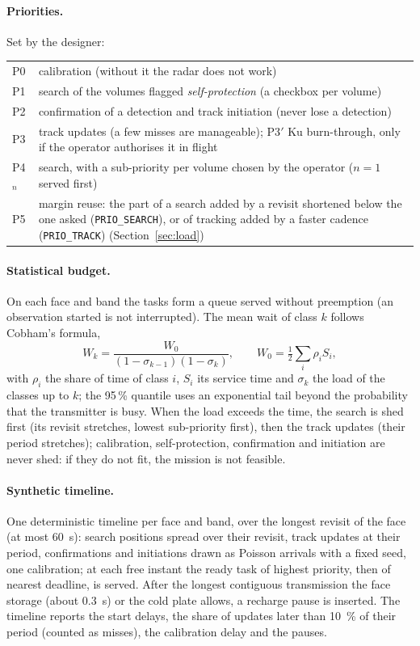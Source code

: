 \documentclass[11pt,a4paper]{article}
\newcommand{\code}[1]{\texttt{\small #1}}
\begin{document}
\paragraph{Priorities.} Set by the designer:
\begin{center}
\begin{tabularx}{\linewidth}{@{}lL@{}}
\toprule
P0 & calibration (without it the radar does not work)\\
P1 & search of the volumes flagged \emph{self-protection} (a checkbox per volume)\\
P2 & confirmation of a detection and track initiation (never lose a detection)\\
P3 & track updates (a few misses are manageable); P3$'$ Ku burn-through, only if the operator authorises it in flight\\
P4$_n$ & search, with a sub-priority per volume chosen by the operator ($n = 1$ served first)\\
P5 & margin reuse: the part of a search added by a revisit shortened below the one asked (\code{PRIO\_SEARCH}), or of
tracking added by a faster cadence (\code{PRIO\_TRACK}) (Section~\ref{sec:load})\\
\bottomrule
\end{tabularx}
\end{center}

\paragraph{Statistical budget.} On each face and band the tasks form a queue served without preemption (an observation
started is not interrupted). The mean wait of class $k$ follows Cobham's formula,
\[
  W_k = \frac{W_0}{(1-\sigma_{k-1})(1-\sigma_k)},\qquad W_0 = \tfrac12\textstyle\sum_i \rho_i S_i,
\]
with $\rho_i$ the share of time of class $i$, $S_i$ its service time and $\sigma_k$ the load of the classes up to $k$;
the 95\,\% quantile uses an exponential tail beyond the probability that the transmitter is busy. When the load exceeds
the time, the search is shed first (its revisit stretches, lowest sub-priority first), then the track updates (their
period stretches); calibration, self-protection, confirmation and initiation are never shed: if they do not fit, the
mission is not feasible.

\paragraph{Synthetic timeline.} One deterministic timeline per face and band, over the longest revisit of the face
(at most \SI{60}{s}): search positions spread over their revisit, track updates at their period, confirmations and
initiations drawn as Poisson arrivals with a fixed seed, one calibration; at each free instant the ready task of
highest priority, then of nearest deadline, is served. After the longest contiguous transmission the face storage
(about \SI{0.3}{s}) or the cold plate allows, a recharge pause is inserted. The timeline reports the start delays, the
share of updates later than \SI{10}{\percent} of their period (counted as misses), the calibration delay and the pauses.
\end{document}

